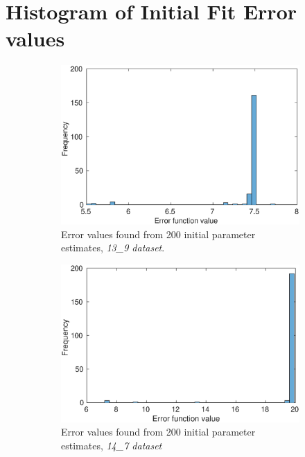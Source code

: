 \documentclass[10pt,journal]{./IEEE_latex_class/IEEEtran}
\begin{document}
\section{Histogram of Initial Fit Error values}
\label{Initial fit Error}
\setcounter{figure}{0}    

\begin{figure}[H]
    \begin{subfigure}[c]{\textwidth}
    \centering
        \includegraphics[scale = 0.5]{13_9_f_hist}
        \caption{Error values found from 200 initial parameter estimates, \textit{13\_9 dataset}.}
    \end{subfigure}
    
    \begin{subfigure}[c]{\textwidth}
    \centering
        \includegraphics[scale = 0.5]{14_7_f_hist}
        \caption{Error values found from 200 initial parameter estimates, \textit{14\_7 dataset}}
    \end{subfigure}
    \caption{}
\label{hist_f}
\end{figure} 
\end{document}
